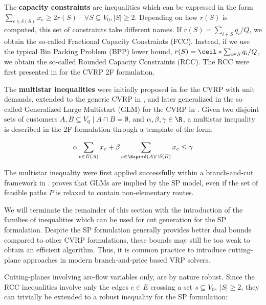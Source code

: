 The \textbf{capacity constraints} are inequalities which can be expressed in the form
$\sum_{e \in \delta(S)} x_e \ge 2 r(S) \quad \forall S \subseteq V_0, |S| \ge 2$.
Depending on how $r(S)$ is computed, this set of constraints take different names.
If $r(S) = \sum_{i \in S} q_i / Q$, we obtain the so-called Fractional Capacity Constraints (FCC).
Instead, if we use the typical Bin Packing Problem (BPP) lower bound, $r(S) = \ceil*{\sum_{i \in S} q_i / Q}$, we obtain the so-called Rounded Capacity Constraints (RCC).
The RCC were first presented in \textcite{laporte1983} for the CVRP 2F formulation.

The \textbf{multistar inequalities} were initially proposed in \textcite{araque1990} for the CVRP with unit demands,
extended to the generic CVRP in \textcite{gouveia1995, achuthan1998},
and later generalized in the so called Generalized Large Multistart (GLM) for the CVRP in \textcite{letchford2002,letchford2006}.
Given two disjoint sets of customers $A, B \subseteq V_0 \mid A \cap B = \emptyset$,
and $\alpha, \beta, \gamma \in \R$,
a multistar inequality is described in the 2F formulation through a
template of the form:

\begin{equation}
	\alpha \sum_{e \in E(A)} x_e + \beta \sum_{e \in \Expr*{\delta(A) \cap \delta(B)}} x_e \le \gamma
\end{equation}

The multistar inequality were first applied successfully within a branch-and-cut framework
in \textcite{araqueg1994}.
\textcite{letchford2006} proves that GLMs are implied by the SP model,
even if the set of feasible paths $P$ is relaxed to contain non-elementary routes.

\medskip

We will terminate the remainder of this section with the introduction
of the families of inequalities which can be used for cut generation
for the SP formulation.
Despite the SP formulation generally provides better dual bounds
compared to other CVRP formulations,
these bounds may still be too weak to obtain an efficient algorithm.
Thus, it is common practice to introduce cutting-plane approaches
in modern branch-and-price based VRP solvers.

Cutting-planes involving arc-flow variables only, are by nature
robust.
Since the RCC inequalities involve only the edges $e \in E$ crossing a set $s \subseteq V_0,\ |S| \ge 2$,
they can trivially be extended to a robust inequality for the SP formulation:

